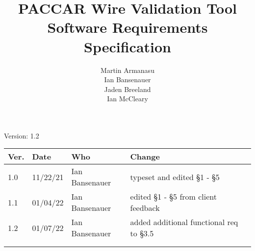 \documentclass[letterpaper,12pt]{article}
\title{PACCAR Wire Validation Tool\\Software Requirements Specification}
\author{Martin Armanasu\\Ian Bansenauer\\Jaden Breeland\\Ian McCleary}
\begin{document}
\maketitle

\begin{center}

  Version: 1.2
\end{center}

\vfill
\begin{tabularx}{\textwidth}{|l|l|l|X|}\hline
Ver. & Date & Who & Change \\\hline
 1.0 & 11/22/21   & Ian Bansenauer & typeset and edited \S 1 - \S5 \\\hline
 1.1 & 01/04/22   & Ian Bansenauer & edited \S 1 - \S5 from client feedback \\\hline
 1.2 & 01/07/22   & Ian Bansenauer & added additional functional req to \S3.5 \\\hline
     &      &     &        \\\hline
     &      &     &        \\\hline
\end{tabularx}

\newpage







\appendix 



\end{document}
